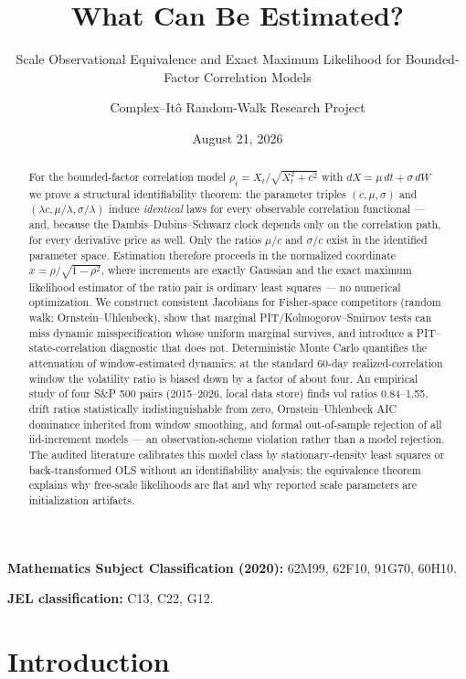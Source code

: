 \documentclass[
  english,
  10pt,
  letterpaper,
  DIV=11,
  numbers=noendperiod]{scrartcl}
\title{What Can Be Estimated?}
\subtitle{Scale Observational Equivalence and Exact Maximum Likelihood
for Bounded-Factor Correlation Models}
\author{Complex--Itô Random-Walk Research Project}
\date{August 21, 2026}
\renewcommand*\contentsname{Table of contents}
\newcommand\contentsname{Table of contents}
\begin{document}
\maketitle
\begin{abstract}
For the bounded-factor correlation model \(\rho_t=X_t/\sqrt{X_t^2+c^2}\)
with \(dX=\mu\,dt+\sigma\,dW\) we prove a structural identifiability
theorem: the parameter triples \((c,\mu,\sigma)\) and
\((\lambda c,\mu/\lambda,\sigma/\lambda)\) induce \emph{identical} laws
for every observable correlation functional --- and, because the
Dambis--Dubins--Schwarz clock depends only on the correlation path, for
every derivative price as well. Only the ratios \(\mu/c\) and
\(\sigma/c\) exist in the identified parameter space. Estimation
therefore proceeds in the normalized coordinate
\(x=\rho/\sqrt{1-\rho^2}\), where increments are exactly Gaussian and
the exact maximum likelihood estimator of the ratio pair is ordinary
least squares --- no numerical optimization. We construct consistent
Jacobians for Fisher-space competitors (random walk;
Ornstein--Uhlenbeck), show that marginal PIT/Kolmogorov--Smirnov tests
can miss dynamic misspecification whose uniform marginal survives, and
introduce a PIT--state-correlation diagnostic that does not.
Deterministic Monte Carlo quantifies the attenuation of window-estimated
dynamics: at the standard 60-day realized-correlation window the
volatility ratio is biased down by a factor of about four. An empirical
study of four S\&P 500 pairs (2015--2026, local data store) finds vol
ratios 0.84--1.55, drift ratios statistically indistinguishable from
zero, Ornstein--Uhlenbeck AIC dominance inherited from window smoothing,
and formal out-of-sample rejection of all iid-increment models --- an
observation-scheme violation rather than a model rejection. The audited
literature calibrates this model class by stationary-density least
squares or back-transformed OLS without an identifiability analysis; the
equivalence theorem explains why free-scale likelihoods are flat and why
reported scale parameters are initialization artifacts.
\end{abstract}

\renewcommand*\contentsname{Table of contents}
{
\setcounter{tocdepth}{2}
\tableofcontents
}

\textbf{Mathematics Subject Classification (2020):} 62M99, 62F10, 91G70,
60H10.

\textbf{JEL classification:} C13, C22, G12.

\section{Introduction}\label{sec-introduction}
\end{document}
